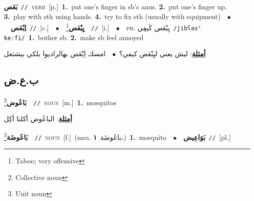 \documentclass[10pt,a4paper,twoside]{article} %
\begin{document}
\begin{multicols}{2}
{\setlength\topsep{0pt}\textbf{\foreignlanguage{arabic}{بَعَص}}\ {\color{gray}\texttt{//}\color{black}}\ \textsc{verb}\ [p.]\ \textbf{1.}~put one's finger in sb's anus.  \textbf{2.}~put one's finger up.  \textbf{3.}~play with sth using hands.  \textbf{4.}~try to fix sth (usually with equipment)\ \ $\bullet$\ \ \setlength\topsep{0pt}\textbf{\foreignlanguage{arabic}{اِبْعَص}}\ {\color{gray}\texttt{//}\color{black}}\ [c.]\ \ $\bullet$\ \ \setlength\topsep{0pt}\textbf{\foreignlanguage{arabic}{يِبْعَص}}\footnote{Taboo; very offensive}\ \ {\color{gray}\texttt{//}\color{black}}\ [i.]\ \ $\bullet$\ \ \textsc{ph.} \color{gray} \foreignlanguage{arabic}{يِبْعَص كَيفِي}\color{black}\ {\color{gray}\texttt{/{\sffamily jibʕasˤ keːfi}/}\color{black}}\ \textbf{1.}~bother sb.  \textbf{2.}~make sb feel annoyed\  \begin{flushright}\color{gray}\foreignlanguage{arabic}{\textbf{\underline{\foreignlanguage{arabic}{أمثلة}}}: ليش يعني ليِبْعَص كيفي؟\ $\bullet$\ \  امسك اِبْعَص بهالراديوا بلكي بيشتغل}\end{flushright}\color{black}} \vspace{2mm}

\vspace{-3mm}
\subsection*{\color{blue}\foreignlanguage{arabic}{ب.ع.ض}\color{blue}{}} 

{\setlength\topsep{0pt}\textbf{\foreignlanguage{arabic}{بَاعُوض}}\footnote{Collective noun}\ \ {\color{gray}\texttt{//}\color{black}}\ \textsc{noun}\ [m.]\ \textbf{1.}~mosquitos\  \begin{flushright}\color{gray}\foreignlanguage{arabic}{\textbf{\underline{\foreignlanguage{arabic}{أمثلة}}}: الباعُوض أكلنا أكِل}\end{flushright}\color{black}} \vspace{2mm}

{\setlength\topsep{0pt}\textbf{\foreignlanguage{arabic}{بَاعُوضَة}}\footnote{Unit noun}\ \ {\color{gray}\texttt{//}\color{black}}\ \textsc{noun}\ [f.]\ \color{gray}(msa. \foreignlanguage{arabic}{باعُوضَة}~\foreignlanguage{arabic}{\textbf{١.}})\color{black}\ \textbf{1.}~mosquito\ \ $\bullet$\ \ \setlength\topsep{0pt}\textbf{\foreignlanguage{arabic}{بَوَاعِيض}}\ {\color{gray}\texttt{//}\color{black}}\ [pl.]\ } \vspace{2mm}


\end{multicols}
\end{document}
